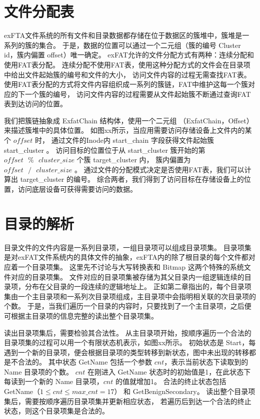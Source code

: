 \section{文件分配表}\label{sec:FAT}
exFTA文件系统的所有文件和目录数据都存储在位于数据区的簇堆中，簇堆是一系列的簇的集合。
于是，数据的位置可以通过一个二元组（簇的编号 Cluster id，簇内偏置 offset）唯一确定。
exFAT允许的文件分配方式有两种：连续分配和使用FAT表分配。
连续分配不使用FAT表，使用这种分配方式的文件会在目录项中给出文件起始簇的编号和文件的大小，
访问文件内容的过程无需查找FAT表。
使用FAT表分配的方式将文件内容组织成一系列的簇链，FAT中维护这每一个簇对应的下一个簇的编号，
访问文件内容的过程需要从文件起始簇不断通过查询FAT表到达访问的位置。

我们把簇链抽象成 ExfatChain 结构体，使用一个二元组 （ExfatChain，Offset） 来描述簇堆中的具体位置。
如图xx所示，当应用需要访问存储设备上文件内的某个 $ offset $ 时，
通过文件的Inode内 start\_chain 字段获得文件起始簇 start\_cluster 。
访问目标的位置位于从 start\_cluster 簇开始的第 $ offset \text{ }\%\text{ } cluster\_size $ 个簇 target\_cluster 内，
簇内偏置为 $ offset \text{ }/\text{ } cluster\_size $ 。
通过文件的分配模式决定是否使用FAT表，我们可以计算出 target\_cluster 的编号。
综合两者，我们得到了访问目标在存储设备上的位置，访问底层设备可获得需要访问的数据。

\section{目录的解析}\label{sec:dentry}
目录文件的文件内容是一系列目录项，一组目录项可以组成目录项集。
目录项集是对exFAT文件系统内的具体文件的抽象，exFTA内的除了根目录的每个文件都对应着一个目录项集。
这里先不讨论与大写转换表和 Bitmap 这两个特殊的系统文件对应的目录项集。
文件对应的目录项集被存储为其父目录内一组逻辑连续的目录项，分布在父目录的一段连续的逻辑地址上。
正如第二章指出的，每个目录项集由一个主目录项和一系列次目录项组成，主目录项中会指明相关联的次目录项的个数。
于是，当我们遍历一个目录的内容时，只要找到了一个主目录项，之后便可根据主目录项的信息完整的读出整个目录项集。

读出目录项集后，需要检验其合法性。
从主目录项开始，按顺序遍历一个合法的目录项集的过程可以用一个有限状态机表示，如图xx所示。
初始状态是 Start，每遇到一个新的目录项，便会根据目录项的类型转移到新状态，图中未出现的转移都是不合法的。
其中状态 GetName 包括一个参数 $ cnt $，表示当前状态下读取到的 Name 目录项的个数。
$ cnt $ 在刚进入 GetName 状态时的初始值是1，在此状态下每读到一个新的 Name 目录项，$ cnt $ 的值就增加1。
合法的终止状态包括 GetName（$ 1 \leq cnt \leq max\_cnt = 17 $） 和 GetBenignSecondary。 
读出整个目录项集后，需要按顺序遍历目录项集并更新相应状态，
若遍历后到达一个合法的终止状态，则这个目录项集是合法的。


